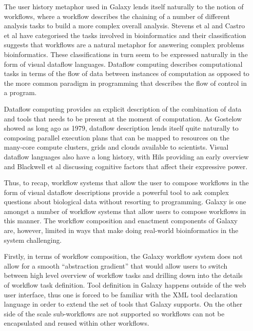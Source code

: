 \documentclass[a4paper,10pt]{scrreprt}
\begin{document}
The user history metaphor used in Galaxy lends itself naturally to the notion of workflows, where a workflow describes the chaining of a number of different analysis tasks to build a more complex overall analysis. Stevens et al \cite{stevens_classification_2001} and Castro et al \cite{castro_workflows_2005} have categorised the tasks involved in bioinformatics and their classification suggests that workflows are a natural metaphor for answering complex problems bioinformatics. These classifications in turn seem to be expressed naturally in the form of visual dataflow languages. Dataflow computing describes computational tasks in terms of the flow of data between instances of computation \cite{gostelow_view_1979} as opposed to the more common paradigm in programming that describes the flow of control in a program.

Dataflow computing provides an explicit description of the combination of data and tools that needs to be present at the moment of computation. As Gostelow \cite{gostelow_view_1979} showed as long ago as 1979, dataflow description lends itself quite naturally to composing parallel execution plans that can be mapped to resources on the many-core compute clusters, grids and clouds available to scientists. Visual dataflow languages also have a long history, with Hils \cite{hils_visual_1992} providing an early overview and Blackwell et al \cite{blackwell_cognitive_2001} discussing cognitive factors that affect their expressive power.

Thus, to recap, workflow systems that allow the user to compose workflows in the form of visual dataflow descriptions provide a powerful tool to ask complex questions about biological data without resorting to programming. Galaxy is one amongst a number of workflow systems that allow users to compose workflows in this manner. The workflow composition and enactment components of Galaxy are, however, limited in ways that make doing real-world bioinformatics in the system challenging.

Firstly, in terms of workflow composition, the Galaxy workflow system does not allow for a smooth ``abstraction gradient'' that would allow users to switch between high level overview of workflow tasks and drilling down into the details of workflow task definition. Tool definition in Galaxy happens outside of the web user interface, thus one is forced to be familiar with the XML tool declaration language in order to extend the set of tools that Galaxy supports. On the other side of the scale sub-workflows are not supported so workflows can not be encapsulated and reused within other workflows.
\end{document}
